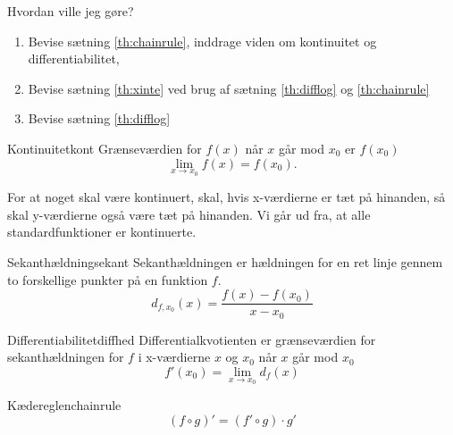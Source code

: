 \documentclass{article}
\begin{document}
\begin{eksempel*}{Hvordan ville jeg gøre?}
	\begin{enumerate}
		\item Bevise sætning \ref{th:chainrule}, inddrage viden om kontinuitet
			og differentiabilitet,
		\item Bevise sætning \ref{th:xinte} ved brug af sætning
			\ref{th:difflog} og \ref{th:chainrule}
		\item Bevise sætning \ref{th:difflog}
	\end{enumerate}
\end{eksempel*}

\begin{definition}{Kontinuitet}{kont}
	Grænseværdien for $f(x)$ når $x$ går mod $x_0$ er $f(x_0)$
	\[\lim_{x\to x_0} f(x) = f(x_0).\]	
\end{definition}

For at noget skal være kontinuert, skal, hvis x-værdierne er tæt på hinanden,
så skal y-værdierne også være tæt på hinanden. Vi går ud fra, at alle
standardfunktioner er kontinuerte.

\newcommand\sek[2]{d_{#1,#2}}
\begin{definition}{Sekanthældning}{sekant}
	Sekanthældningen er hældningen for en ret linje gennem to forskellige
	punkter på en funktion $f$.
	\[
		d_{f,x_0}(x) = \frac{f(x) - f(x_0)}{x - x_0}
	\] 
\end{definition}

\begin{definition}{Differentiabilitet}{diffhed}
	Differentialkvotienten er grænseværdien for sekanthældningen for $f$ i
	x-værdierne $x$ og $x_0$ når $x$ går mod $x_0$
	\[f'(x_0) = \lim_{x \to x_0} d_f(x)\]
\end{definition}

\begin{theorem}{Kædereglen}{chainrule}
	\[
		(f \circ g)' = (f' \circ g) \cdot g'
	\] 
\end{theorem}
\end{document}
